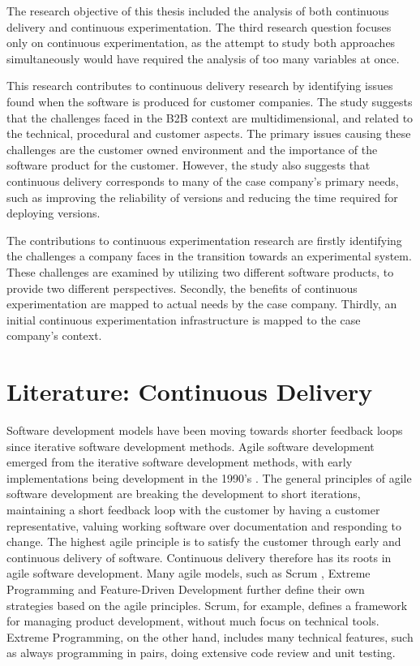 \documentclass[english]{tktltiki2}
\theoremstyle{definition}
\theoremstyle{remark}
\begin{document}
The research objective of this thesis included the analysis of both continuous delivery and continuous experimentation. The third research question focuses only on continuous experimentation, as the attempt to study both approaches simultaneously would have required the analysis of too many variables at once. 

This research contributes to continuous delivery research by identifying issues found when the software is produced for customer companies. The study suggests that the challenges faced in the B2B context are multidimensional, and related to the technical, procedural and customer aspects. The primary issues causing these challenges are the customer owned environment and the importance of the software product for the customer. However, the study also suggests that continuous delivery corresponds to many of the case company's primary needs, such as improving the reliability of versions and reducing the time required for deploying versions. %

The contributions to continuous experimentation research are firstly identifying the challenges a company faces in the transition towards an experimental system. These challenges are examined by utilizing two different software products, to provide two different perspectives. Secondly, the benefits of continuous experimentation are mapped to actual needs by the case company. Thirdly, an initial continuous experimentation infrastructure \cite{fagerholm2014building} is mapped to the case company's context.
\section{Literature: Continuous Delivery}
Software development models have been moving towards shorter feedback loops since iterative software development methods. Agile software development emerged from the iterative software development methods, with early implementations being development in the 1990's \cite{dybaa2008empirical}. The general principles of agile software development are breaking the development to short iterations, maintaining a short feedback loop with the customer by having a customer representative, valuing working software over documentation and responding to change. The highest agile principle is to satisfy the customer through early and continuous delivery of software. Continuous delivery therefore has its roots in agile software development. Many agile models, such as Scrum \cite{schwaber2002gile}, Extreme Programming \cite{beck2000extreme} and Feature-Driven Development \cite{palmer2001practical} further define their own strategies based on the agile principles. Scrum, for example, defines a framework for managing product development, without much focus on technical tools. Extreme Programming, on the other hand, includes many technical features, such as always programming in pairs, doing extensive code review and unit testing.
\end{document}

